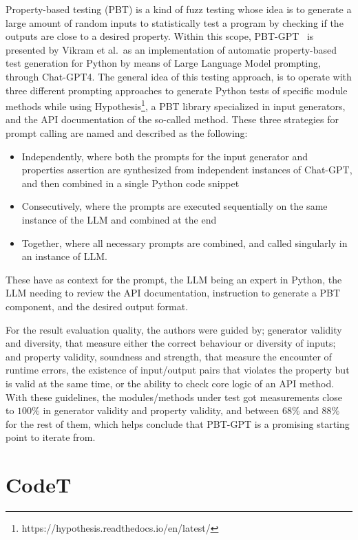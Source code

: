 \documentclass[%
  chapterprefix=false,%
  open=right,%
  twoside=true,%
  paper=a4,%
  logofile={Figures/logo.png},%
  thesistype=master,%
  UKenglish,%
]{se2thesis}
\begin{document}
Property-based testing (PBT) is a kind of fuzz testing whose idea is to generate a large amount of random inputs to statistically test a program by checking if the outputs are close to a desired property.
Within this scope, PBT-GPT~\cite{DBLP:journals/corr/abs-2307-04346} is presented by Vikram et al.\ as an implementation of automatic property-based test generation for Python by means of Large Language Model prompting, through Chat-GPT4.
The general idea of this testing approach, is to operate with three different prompting approaches to generate Python tests of specific module methods while using Hypothesis\footnote{https://hypothesis.readthedocs.io/en/latest/}, a PBT library specialized in input generators, and the API documentation of the so-called method.
These three strategies for prompt calling are named and described as the following:

\begin{itemize}
  \item Independently, where both the prompts for the input generator and properties assertion are synthesized from independent instances of Chat-GPT, and then combined in a single Python code snippet
  \item Consecutively, where the prompts are executed sequentially on the same instance of the LLM and combined at the end
  \item Together, where all necessary prompts are combined, and called singularly in an instance of LLM.\@
\end{itemize}

These have as context for the prompt, the LLM being an expert in Python, the LLM needing to review the API documentation, instruction to generate a PBT component, and the desired output format.

For the result evaluation quality, the authors were guided by; generator validity and diversity, that measure either the correct behaviour or diversity of inputs; and property validity, soundness and strength, that measure the encounter of runtime errors, the existence of input/output pairs that violates the property but is valid at the same time, or the ability to check core logic of an API method.
With these guidelines, the modules/methods under test got measurements close to \(100\%\) in generator validity and property validity, and between \(68\%\) and \(88\%\) for the rest of them, which helps conclude that PBT-GPT is a promising starting point to iterate from.

\section{CodeT}
\end{document}
